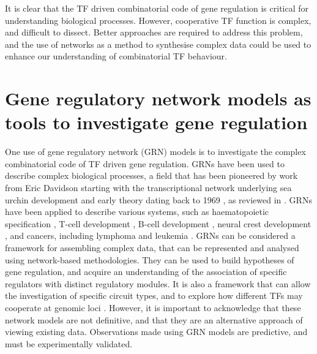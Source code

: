 It is clear that the TF driven combinatorial code of gene regulation is critical for understanding biological processes. However, cooperative TF function is complex, and difficult to dissect. Better approaches are required to address this problem, and the use of networks as a method to synthesise complex data could be used to enhance our understanding of combinatorial TF behaviour.


\section{Gene regulatory network models as tools to investigate gene regulation}

One use of gene regulatory network (GRN) models is to investigate the complex combinatorial code of TF driven gene regulation. GRNs have been used to describe complex biological processes, a field that has been pioneered by work from Eric Davidson starting with the transcriptional network underlying sea urchin development \citep{davidson_genomic_2002, oliveri_gene_2004, yuh_genomic_1998} and early theory dating back to 1969 \citep{britten_gene_1969}, as reviewed in \cite{rothenberg_how_2021}. GRNs have been applied to describe various systems, such as haematopoietic specification \citep{goode_dynamic_2016}, T-cell development \citep{georgescu_gene_2008, kueh_regulatory_2012, ciofani_validated_2012}, B-cell development \citep{boller_regulatory_2014, sciammas_incoherent_2011}, neural crest development \citep{williams_reconstruction_2019, simoes-costa_establishing_2015, meulemans_gene-regulatory_2004}, and cancers, including lymphoma \citep{de_matos_simoes_b-cell_2013} and leukemia \citep{assi_subtype-specific_2019}. GRNs can be considered a framework for assembling complex data, that can be represented and analysed using network-based methodologies. They can be used to build hypotheses of gene regulation, and acquire an understanding of the association of specific regulators with distinct regulatory modules. It is also a framework that can allow the investigation of specific circuit types, and to explore how different TFs may cooperate at genomic loci \citep{shen-orr_network_2002, milo_network_2002, mangan_structure_2003}. However, it is important to acknowledge that these network models are not definitive, and that they are an alternative approach of viewing existing data. Observations made using GRN models are predictive, and must be experimentally validated. 


